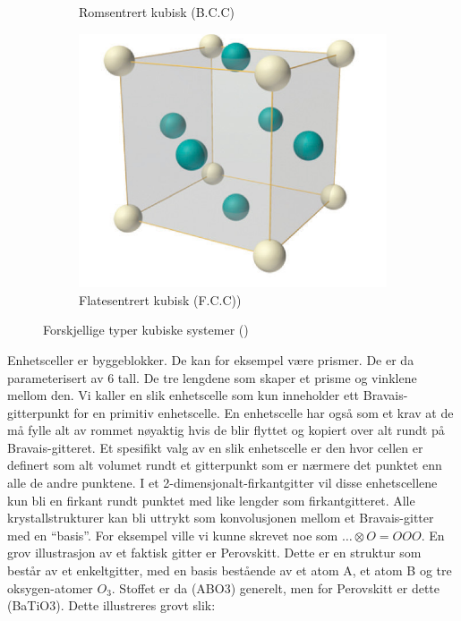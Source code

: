 \documentclass{article}
\begin{document}
\begin{figure}[H]
\begin{subfigure}{0.3\textwidth}
    \caption{Romsentrert kubisk (B.C.C)}
    \label{fig:romsentert_kubisk}
  \end{subfigure}
  \begin{subfigure}{0.3\textwidth}
    \includegraphics[width=\linewidth]{bilder/flatesentrert_kubisk.png}
    \caption{Flatesentrert kubisk (F.C.C))}
    \label{fig:flatesentrert_kubisk}
  \end{subfigure}
  \caption{Forskjellige typer kubiske systemer (\cite{kubiske_systemer})}
  \label{fig:kubiske_interpolasjoner}
\end{figure}
Enhetsceller er byggeblokker. De kan for eksempel være prismer. De er da parameterisert av 6 tall. De tre lengdene som skaper et prisme og vinklene mellom den. Vi kaller en slik enhetscelle som kun inneholder ett Bravais-gitterpunkt for en primitiv enhetscelle. En enhetscelle har også som et krav at de må fylle alt av rommet nøyaktig hvis de blir flyttet og kopiert over alt rundt på Bravais-gitteret.
Et spesifikt valg av en slik enhetscelle er den hvor cellen er definert som alt volumet rundt et gitterpunkt som er nærmere det punktet enn alle de andre punktene. I et 2-dimensjonalt-firkantgitter vil disse enhetscellene kun bli en firkant rundt punktet med like lengder som firkantgitteret.
Alle krystallstrukturer kan bli uttrykt som konvolusjonen mellom et Bravais-gitter med en \enquote{basis}. For eksempel ville vi kunne skrevet noe som $\dots \otimes O = O O O$. En grov illustrasjon av et faktisk gitter er Perovskitt. Dette er en struktur som består av et enkeltgitter, med en basis bestående av et atom A, et atom B og tre oksygen-atomer $O_3$. Stoffet er da (ABO3) generelt, men for Perovskitt er dette (BaTiO3). Dette illustreres grovt slik:
\end{document}
